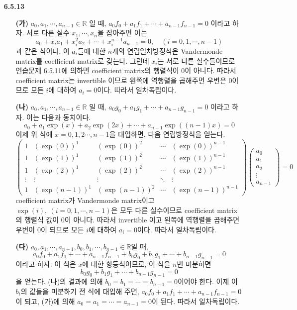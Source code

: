 \documentclass{article}
\begin{document}
\begin{itemize}
\item[\textbf{6.5.13}]
	\begin{itemize}
		\item[\textbf{(가)}] $a_0, a_1, \cdots, a_{n-1} \in \mathbb{R}$ 일 때, $a_0f_0 + a_1f_1+\cdots+a_{n-1}f_{n-1} = 0$ 이라고 하자. 서로 다른 실수 $x_1, \cdots, x_n$을 잡아주면 이는 $$a_0+x_ia_1+x_i^2a_2 +\cdots + x_i^{n-1}a_{n-1} =0, \quad (i = 0, 1, \cdots, n-1)$$과 같은 식이다. 이 $a_i$들에 대한 $n$개의 연립일차방정식은 Vandermonde matrix를 coefficient matrix로 갖는다. 그런데 $x_i$는 서로 다른 실수들이므로 연습문제 6.5.11에 의하면 coefficient matrix의 행렬식이 $0$이 아니다. 따라서 coefficient matrix는 invertible 이므로 왼쪽에 역행렬을 곱해주면 우변은 $0$이므로 모든 $i$에 대하여 $a_i = 0$이다. 따라서 일차독립이다.
		\item[\textbf{(나)}]  $a_0, a_1, \cdots, a_{n-1} \in \mathbb{R}$ 일 때, $a_0g_0 + a_1g_1+\cdots+a_{n-1}g_{n-1} = 0$ 이라고 하자. 이는 다음과 동치이다.
		$$a_0+a_1\exp(x)+a_2\exp(2x)+\cdots+a_{n-1}\exp((n-1)x) = 0$$
		이제 위 식에 $x= 0, 1, 2\cdots, n-1$을 대입하면, 다음 연립방정식을 얻는다.
		$$
			\begin{pmatrix}
			1 & (\exp(0))^1 & (\exp(0))^2 & \cdots & (\exp(0))^{n-1}\\
			1 & (\exp(1))^1 & (\exp(1))^2 & \cdots & (\exp(1))^{n-1}\\
			1 & (\exp(2))^1 & (\exp(2))^2 & \cdots & (\exp(2))^{n-1}\\
			\vdots & \vdots & \vdots & \ddots & \vdots\\
			1 & (\exp(n-1))^1 & (\exp(n-1))^2 & \cdots & (\exp(n-1))^{n-1} 
			\end{pmatrix} 
			\begin{pmatrix}
				a_0 \\ a_1 \\ a_2 \\ \vdots \\ a_{n-1}
			\end{pmatrix} = 0
		$$ coefficient matrix가 Vandermonde matrix이고 $\exp(i), \: (i = 0, 1, \cdots, n-1)$은 모두 다른 실수이므로 coefficient matrix의 행렬식 값이 $0$이 아니다. 따라서 invertible 이고 왼쪽에 역행렬을 곱해주면 우변이 $0$이 되므로 모든 $i$에 대하여 $a_i = 0$이다. 따라서 일차독립이다.
		\item[\textbf{(다)}] $a_0, a_1, \cdots, a_{n-1}, b_0, b_1, \cdots, b_{n-1} \in \mathbb{R}$일 때, $$a_0f_0 + a_1f_1+\cdots+a_{n-1}f_{n-1} + b_0g_0 + b_1g_1+\cdots+b_{n-1}g_{n-1} = 0$$ 이라고 하자. 이 식은 $x$에 대한 항등식이므로, 이 식을 $n$번 미분하면 $$b_0g_0 + b_1g_1+\cdots+b_{n-1}g_{n-1} = 0$$ 을 얻는다. (나)의 결과에 의해 $b_0 = b_1 = \cdots = b_{n-1} = 0$이어야 한다. 이제 이 $b_i$의 값들을 미분하기 전 식에 대입해 주면, $a_0f_0 + a_1f_1+\cdots+a_{n-1}f_{n-1} = 0$이 되고, (가)에 의해 $a_0 = a_1 = \cdots = a_{n-1} = 0$이 된다. 따라서 일차독립이다.
	\end{itemize}

















\end{itemize}
\end{document}
